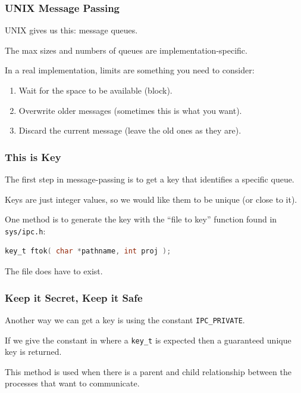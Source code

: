 \begin{frame}
\frametitle{UNIX Message Passing}

UNIX gives us this: message queues.

The max sizes and numbers of queues are implementation-specific.

In a real implementation, limits are something you need to consider:
\begin{enumerate}
       \item Wait for the space to be available (block).
       \item Overwrite older messages (sometimes this is what you want).
       \item Discard the current message (leave the old ones as they are).
\end{enumerate}

\end{frame}


\begin{frame}[fragile]
\frametitle{This is Key}

The first step in message-passing is to get a \alert{key} that identifies a specific queue. 

Keys are just integer values, so we would like them to be unique (or close to it).

One method is to generate the key with the ``file to key'' function found in \texttt{sys/ipc.h}:


\begin{lstlisting}[language=C]
key_t ftok( char *pathname, int proj );
\end{lstlisting}

The file does have to exist.

\end{frame}


\begin{frame}
\frametitle{Keep it Secret, Keep it Safe}

Another way we can get a key is using the constant \texttt{IPC\_PRIVATE}. 

If we give the constant in where a \texttt{key\_t} is expected then a guaranteed unique key is returned. 

This method is used when there is a parent and child relationship between the processes that want to communicate.

\end{frame}


